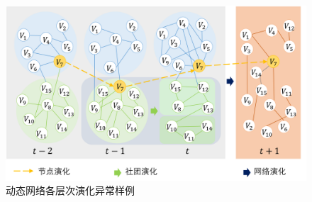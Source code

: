 \begin{figure}[htbp]
    \centering
    \includegraphics[width=.85\linewidth,trim=0.1in 0.5in 0.1in 0.1in]{figures/chap05/chap5motivation.png}
    \caption{动态网络各层次演化异常样例}
    \label{fig:example}
\end{figure} 



